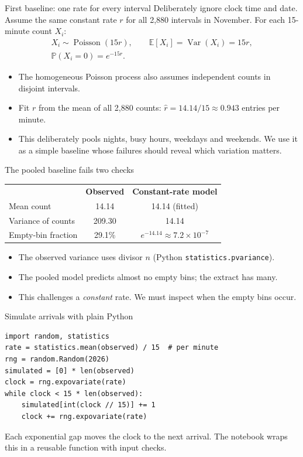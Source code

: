 \documentclass{beamer}
\begin{document}
\begin{frame}{First baseline: one rate for every interval}
  Deliberately ignore clock time and date. Assume the same constant rate $r$ for all 2,880 intervals in November. For each 15-minute count $X_i$:
  \begin{gather*}
    X_i\sim\operatorname{Poisson}(15r),\qquad
    \mathbb E[X_i]=\operatorname{Var}(X_i)=15r,\\
    \mathbb P(X_i=0)=e^{-15r}.
  \end{gather*}
  \vspace{-0.5cm}
  \begin{itemize}
    \item The homogeneous Poisson process also assumes independent counts in disjoint intervals.
    \item Fit $r$ from the mean of all 2,880 counts: $\hat r=14.14/15\approx0.943$ entries per minute.
    \item This deliberately pools nights, busy hours, weekdays and weekends. We use it as a simple baseline whose failures should reveal which variation matters.
  \end{itemize}
\end{frame}

\begin{frame}{The pooled baseline fails two checks}
  \small
  \begin{tabular}{@{}lcc@{}}
    & \textbf{Observed} & \textbf{Constant-rate model}\\[0.35em]
    Mean count & 14.14 & 14.14 (fitted)\\[0.35em]
    Variance of counts & 209.30 & 14.14\\[0.35em]
    Empty-bin fraction & 29.1\% & $e^{-14.14}\approx7.2\times10^{-7}$\\
  \end{tabular}
  \vspace{0.7em}
  \begin{itemize}
    \item The observed variance uses divisor $n$ (Python \texttt{statistics.pvariance}).
    \item The pooled model predicts almost no empty bins; the extract has many.
    \item This challenges a \emph{constant} rate. We must inspect when the empty bins occur.
  \end{itemize}
\end{frame}

\begin{frame}[fragile]{Simulate arrivals with plain Python}
  \small
\begin{verbatim}
import random, statistics
rate = statistics.mean(observed) / 15  # per minute
rng = random.Random(2026)
simulated = [0] * len(observed)
clock = rng.expovariate(rate)
while clock < 15 * len(observed):
    simulated[int(clock // 15)] += 1
    clock += rng.expovariate(rate)
\end{verbatim}
  \vspace{0.2em}
  Each exponential gap moves the clock to the next arrival. The notebook wraps this in a reusable function with input checks.
\end{frame}
\end{document}
